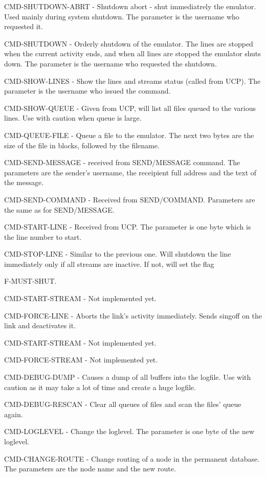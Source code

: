 CMD-SHUTDOWN-ABRT  -  Shutdown  abort  - shut immediatrely the emulator.
Used mainly during system shutdown. The parameter is  the  username  who
requested it.

CMD-SHUTDOWN  -  Orderly shutdown of the emulator. The lines are stopped
when the current activity ends, and  when  all  lines  are  stopped  the
emulator  shuts  down.  The  parameter is the username who requested the
shutdown.

CMD-SHOW-LINES - Show the lines and streams status  (called  from  UCP).
The parameter is the username who issued the command.

CMD-SHOW-QUEUE  -  Given  from  UCP,  will  list all files queued to the
various lines. Use with caution when queue is large.

CMD-QUEUE-FILE - Queue a file to the emulator. The next  two  bytes  are
the size of the file in blocks, followed by the filename.

CMD-SEND-MESSAGE  -  received  from SEND/MESSAGE command. The parameters
are the sender's username, the receipient full address and the  text  of
the message.

CMD-SEND-COMMAND  -  Received from SEND/COMMAND. Parameters are the same
as for SEND/MESSAGE.

CMD-START-LINE - Received from UCP. The parameter is one byte  which  is
the line number to start.

CMD-STOP-LINE  -  Similar  to  the  previous one. Will shutdown the line
immediately only if all streams are inactive. If not, will set the  flag

F-MUST-SHUT.

CMD-START-STREAM - Not implemented yet.

CMD-FORCE-LINE  -  Aborts the link's activity immediately. Sends singoff
on the link and deactivates it.

CMD-START-STREAM - Not implemented yet.

CMD-FORCE-STREAM - Not implemented yet.

CMD-DEBUG-DUMP - Causes a dump of all buffers into the logfile. Use with
caution as it may take a lot of time and create a huge logfile.

CMD-DEBUG-RESCAN  -  Clear all queues of files and scan the files' queue
again.

CMD-LOGLEVEL - Change the loglevel. The parameter is one byte of the new
loglevel.

CMD-CHANGE-ROUTE  -  Change routing of a node in the permanent database.
The parameters are the node name and the new route.

